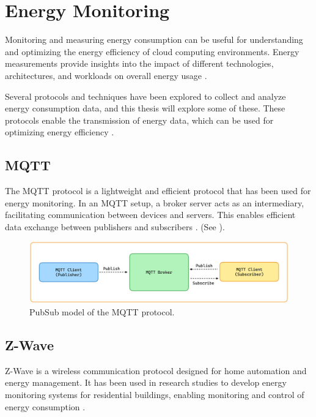 \documentclass[
  table]{report}
\begin{document}
\section{Energy Monitoring}
\label{sect:energy_monitoring}

Monitoring and measuring energy consumption can be useful for
understanding and optimizing the energy efficiency of cloud computing
environments. Energy measurements provide insights into the impact of
different technologies, architectures, and workloads on overall energy
usage
\citep{shehabiUnitedStatesData2016, al-fuqahaInternetThingsSurvey2015}.

Several protocols and techniques have been explored to collect and
analyze energy consumption data, and this thesis will explore some of
these. These protocols enable the transmission of energy data, which can
be used for optimizing energy efficiency
\citep{al-fuqahaInternetThingsSurvey2015}.

\subsection{MQTT}

The \ac{MQTT} protocol is a lightweight and efficient protocol that has
been used for energy monitoring. In an \ac{MQTT} setup, a broker server
acts as an intermediary, facilitating communication between devices and
servers. This enables efficient data exchange between publishers and
subscribers \citep{al-fuqahaInternetThingsSurvey2015}. (See
).

\begin{figure}[H]
\centering
  \includegraphics{assets/3-mqtt-pubsub.png}
  \caption{PubSub model of the \ac{MQTT} protocol.}
  \label{fig:mqtt-model.png}
\end{figure}

\subsection{Z-Wave}

Z-Wave is a wireless communication protocol designed for home automation
and energy management. It has been used in research studies to develop
energy monitoring systems for residential buildings, enabling monitoring
and control of energy consumption
\citep{al-fuqahaInternetThingsSurvey2015}.
\end{document}
